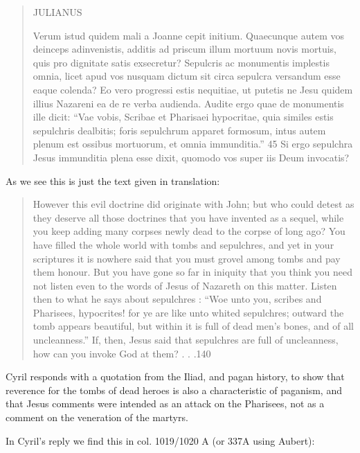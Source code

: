 \begin{quote}

JULIANUS

Verum istud quidem mali a Joanne cepit initium. Quaecunque autem vos
deinceps adinvenistis, additis ad priscum illum mortuum novis mortuis, quis
pro dignitate satis exsecretur? Sepulcris ac monumentis implestis omnia, licet
apud vos nusquam dictum sit circa sepulcra versandum esse eaque colenda? Eo
vero progressi estis nequitiae, ut putetis ne Jesu quidem illius Nazareni ea
de re verba audienda. Audite ergo quae de monumentis ille dicit: ``Vae
vobis, Scribae et Pharisaei hypocritae, quia similes estis sepulchris
dealbitis; foris sepulchrum apparet formosum, intus autem plenum est ossibus
mortuorum, et omnia immunditia.'' 45 Si ergo sepulchra Jesus immunditia
plena esse dixit, quomodo vos super iis Deum invocatis?

\end{quote}

As we see this is just the text given in translation:

\begin{quote}

However this evil doctrine did originate with John; but who could detest as
they deserve all those doctrines that you have invented as a sequel, while you
keep adding many corpses newly dead to the corpse of long ago? You have filled
the whole world with tombs and sepulchres, and yet in your scriptures it is
nowhere said that you must grovel among tombs and pay them honour. But you
have gone so far in iniquity that you think you need not listen even to the
words of Jesus of Nazareth on this matter. Listen then to what he says about
sepulchres : ``Woe unto you, scribes and Pharisees, hypocrites! for ye are
like unto whited sepulchres; outward the tomb appears beautiful, but within it
is full of dead men's bones, and of all uncleanness.'' If, then, Jesus
said that sepulchres are full of uncleanness, how can you invoke God at them?
. . .140

\end{quote}

Cyril responds with a quotation from the Iliad, and pagan history, to show that
reverence for the tombs of dead heroes is also a characteristic of paganism, and
that Jesus comments were intended as an attack on the Pharisees, not as a
comment on the veneration of the martyrs.

In Cyril's reply we find this in col. 1019/1020 A (or 337A using Aubert):

